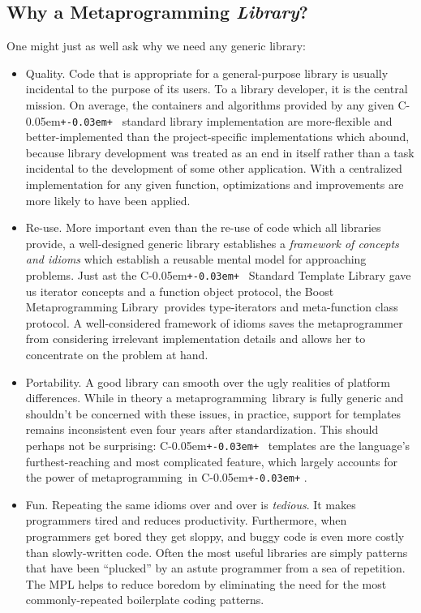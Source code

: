 \documentclass{netobjectdays}
\newcommand{\Cpp}{C\kern-0.05em\texttt{+\kern-0.03em+}%
}
\newcommand{\Mpl}{Boost Meta\-program\-ming Library}
\newcommand{\mping}{meta\-program\-ming}
\newcommand{\mpgmer}{meta\-program\-mer}
\begin{document}
\subsection{Why a Metaprogramming \emph{Library}?}

One might just as well ask why we need any generic library: 
 
\begin{itemize}

\item Quality. Code that is appropriate for a general-purpose library
  is usually incidental to the purpose of its users. To a library
  developer, it is the central mission. On average, the containers and
  algorithms provided by any given \Cpp\ standard library
  implementation are more-flexible and better-implemented than the
  project-specific implementations which abound, because library
  development was treated as an end in itself rather than a task
  incidental to the development of some other application. With a
  centralized implementation for any given function, optimizations and
  improvements are more likely to have been applied.

\item Re-use. More important even than the re-use of code which all
  libraries provide, a well-designed generic library establishes a
  \emph{framework of concepts and idioms} which establish a reusable
  mental model for approaching problems. Just ast the \Cpp\ Standard
  Template Library gave us iterator concepts and a function object
  protocol, the \Mpl\ provides type-iterators and meta-function class
  protocol. A well-considered framework of idioms saves the \mpgmer{}
  from considering irrelevant implementation details and allows her to
  concentrate on the problem at hand.

\item Portability. A good library can smooth over the ugly realities
  of platform differences. While in theory a \mping\ library is fully
  generic and shouldn't be concerned with these issues, in practice,
  support for templates remains inconsistent even four years after
  standardization. This should perhaps not be surprising: \Cpp\
  templates are the language's furthest-reaching and most complicated
  feature, which largely accounts for the power of \mping\ in \Cpp.

\item Fun. Repeating the same idioms over and over is
  \emph{tedious}. It makes programmers tired and reduces
  productivity. Furthermore, when programmers get bored they get
  sloppy, and buggy code is even more costly than slowly-written
  code. Often the most useful libraries are simply patterns that have
  been ``plucked'' by an astute programmer from a sea of
  repetition. The MPL helps to reduce boredom by eliminating the need
  for the most commonly-repeated boilerplate coding patterns.

\end{itemize}
\end{document}
